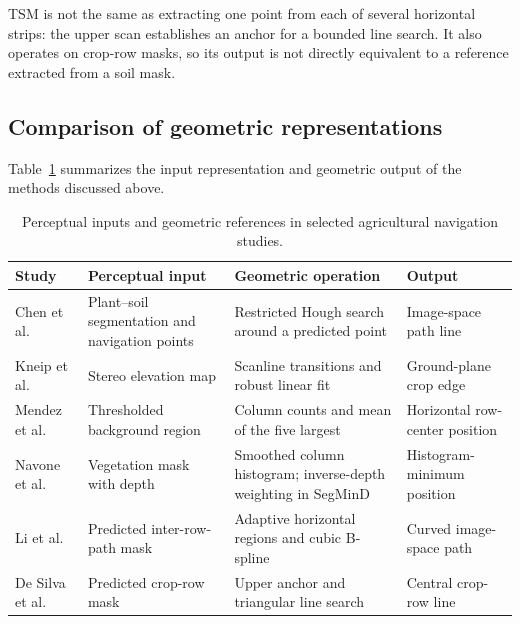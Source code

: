 TSM is not the same as extracting one point from each of several
horizontal strips: the upper scan establishes an anchor for a bounded
line search. It also operates on crop-row masks, so its output is not
directly equivalent to a reference extracted from a soil mask.

\subsection{Comparison of geometric representations}
\label{subsec:confronto_riferimenti}

Table~\ref{tab:confronto_riferimenti_geometrici} summarizes the input
representation and geometric output of the methods discussed above.

\begin{table}[htbp]
    \centering
    \footnotesize
    \setlength{\tabcolsep}{3pt}
    \renewcommand{\arraystretch}{1.15}
    \caption{Perceptual inputs and geometric references in selected
    agricultural navigation studies.}
    \label{tab:confronto_riferimenti_geometrici}
    \begin{tabularx}{\textwidth}{@{}>{\raggedright\arraybackslash}p{}
        >{\raggedright\arraybackslash}X
        >{\raggedright\arraybackslash}X
        >{\raggedright\arraybackslash}p{}@{}}
        \toprule
        Study & Perceptual input & Geometric operation & Output \\
        \midrule
        Chen et al.\ \cite{chen2021navigation}
        & Plant--soil segmentation and navigation points
        & Restricted Hough search around a predicted point
        & Image-space path line \\
        \addlinespace
        Kneip et al.\ \cite{kneip2020cropedge}
        & Stereo elevation map
        & Scanline transitions and robust linear fit
        & Ground-plane crop edge \\
        \addlinespace
        Mendez et al.\ \cite{mendez2023vineyards}
        & Thresholded background region
        & Column counts and mean of the five largest
        & Horizontal row-center position \\
        \addlinespace
        Navone et al.\ \cite{navone2025gpsfree}
        & Vegetation mask with depth
        & Smoothed column histogram; inverse-depth weighting in SegMinD
        & Histogram-minimum position \\
        \addlinespace
        Li et al.\ \cite{li2022multiroi}
        & Predicted inter-row-path mask
        & Adaptive horizontal regions and cubic B-spline
        & Curved image-space path \\
        \addlinespace
        De Silva et al.\ \cite{silva2023rowdetection}
        & Predicted crop-row mask
        & Upper anchor and triangular line search
        & Central crop-row line \\
        \bottomrule
    \end{tabularx}
\end{table}

